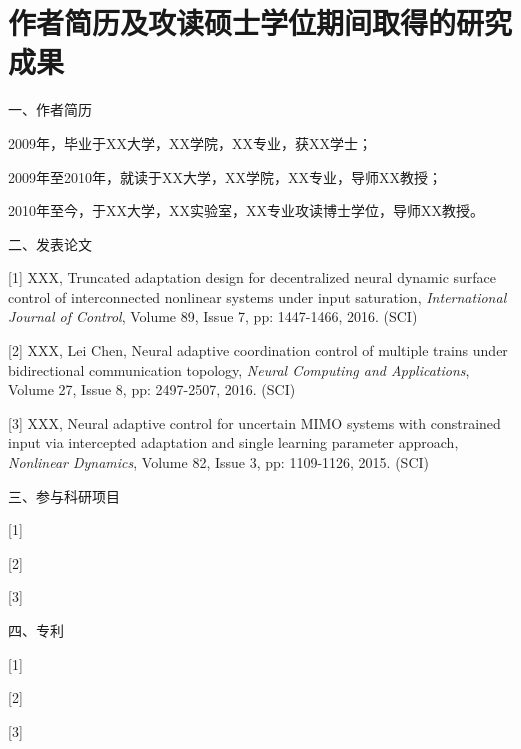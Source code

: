  \setlength{\baselineskip}{16pt}
\chapter{作者简历及攻读硕士学位期间取得的研究成果}
\setlength{\parindent}{0pt}


一、作者简历

2009年，毕业于XX大学，XX学院，XX专业，获XX学士；

2009年至2010年，就读于XX大学，XX学院，XX专业，导师XX教授；

2010年至今，于XX大学，XX实验室，XX专业攻读博士学位，导师XX教授。

\vspace{10pt}
二、发表论文

[1] XXX, Truncated adaptation design for decentralized neural dynamic surface control of interconnected nonlinear systems under input saturation, \emph{International Journal of Control}, Volume 89, Issue 7, pp: 1447-1466, 2016. (SCI)\vspace{-5pt}

[2] XXX, Lei Chen, Neural adaptive coordination control of multiple trains under bidirectional communication topology, \emph{Neural Computing and Applications}, Volume 27, Issue 8, pp: 2497-2507, 2016. (SCI)

[3] XXX, Neural adaptive control for uncertain MIMO systems with constrained input via intercepted adaptation and single learning parameter approach, \emph{Nonlinear Dynamics}, Volume 82, Issue 3, pp: 1109-1126, 2015. (SCI)


\vspace{10pt}
三、参与科研项目

[1]

[2]

[3]

\vspace{10pt}
四、专利

[1]

[2]

[3]


%
%
%
%
%    
%

